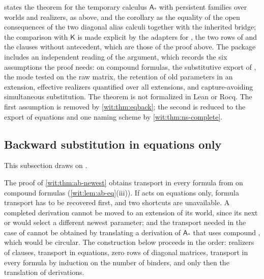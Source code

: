 \begin{remark}
\label{wit:rem:ab-package}
 states the theorem for the temporary calculus
$\mathsf{A}_{\ast}$ with persistent families over worlds and realizers, as
above, and the corollary as the equality of the open consequences of the
two diagonal alias calculi together with the inherited bridge; the
comparison with $\mathsf{K}$ is made explicit by the adapters for
, the two rows of  and the clauses without
antecedent, which are those of the proof above.  The package includes an
independent reading of the argument, which records the six assumptions
the proof needs:  on compound formulas, the substitutive
export of , the mode tested on the raw matrix, the
retention of old parameters in an extension, effective realizers quantified
over all extensions, and capture-avoiding simultaneous substitution.  The
theorem is not formalized in Lean or Rocq.  The first assumption is removed
by \cref{wit:thm:eqback}; the second is reduced to the export of equations
and one naming scheme by \cref{wit:thm:ns-complete}.
\end{remark}

\subsection{Backward substitution in equations only}
\label{wit:sec:eqback}

This subsection draws on .

The proof of \cref{wit:thm:ab-newest} obtains transport in every formula
from  on compound formulas (\cref{wit:lem:ab-eq}(iii)).  If
 acts on equations only, formula transport has to be
recovered first, and two shortcuts are unavailable.  A completed derivation
cannot be moved to an extension of its world, since its next 
or  would select a different newest parameter; and the
transport needed in the case of  cannot be obtained by
translating a derivation of $\mathsf{A}_{\ast}$ that uses compound
, which would be circular.  The construction below proceeds
in the order: realizers of clauses, transport in equations, zero rows of
diagonal matrices, transport in every formula by induction on the number of
binders, and only then the translation of derivations.

